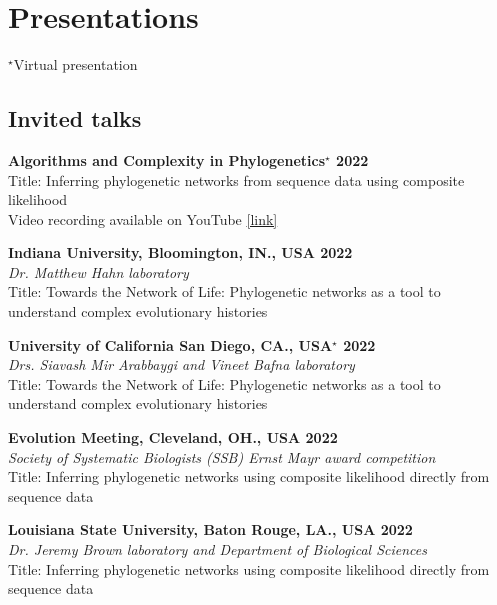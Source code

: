\documentclass[11pt,letterpaper,sans]{moderncv} %
\begin{document}
\pagebreak
\section{Presentations}
$^\star$Virtual presentation
\subsection{Invited talks}
\begin{etaremune}
	\item \textbf{Algorithms and Complexity in Phylogenetics$^\star$ \hfill 2022}\\
		{\small Title: Inferring phylogenetic networks from sequence data using composite likelihood\\
		Video recording available on YouTube \href{https://www.youtube.com/watch?v=t6Ta-0Wz1ys&t=1915s}{[link]}}

	\item \textbf{Indiana University, Bloomington, IN., USA \hfill 2022}\\
		{\small \textit{Dr. Matthew Hahn laboratory}\\
		Title: Towards the Network of Life: Phylogenetic networks as a tool to understand complex evolutionary histories}
		
	\item \textbf{University of California San Diego, CA., USA$^\star$ \hfill 2022}\\
		{\small \textit{Drs. Siavash Mir Arabbaygi and Vineet Bafna laboratory}\\
		Title: Towards the Network of Life: Phylogenetic networks as a tool to understand complex evolutionary histories}
		
	\item \textbf{Evolution Meeting, Cleveland, OH., USA \hfill 2022}\\
		{\small \textit{Society of Systematic Biologists (SSB) Ernst Mayr award competition}\\
		Title: Inferring phylogenetic networks using composite likelihood directly from sequence data}
		
	\item \textbf{Louisiana State University, Baton Rouge, LA., USA \hfill 2022}\\
		{\small \textit{Dr. Jeremy Brown laboratory and Department of Biological Sciences}\\
		Title: Inferring phylogenetic networks using composite likelihood directly from sequence data}
		

\end{etaremune}
\end{document}
